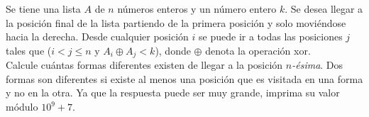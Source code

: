 %

Se tiene una lista $A$ de $n$ números enteros y un número entero $k$. Se desea llegar a la posición final de la lista partiendo de la primera posición y solo moviéndose hacia la derecha. Desde cualquier posición $i$ se puede ir a todas las posiciones $j$ tales que ($i < j \le n$ y $A_i \oplus A_j < k$), donde $\oplus$ denota la operación xor.\\

Calcule cuántas formas diferentes existen de llegar a la posición $n$\textit{-ésima}. Dos formas son diferentes si existe al menos una posición que es visitada en una forma y no en la otra. Ya que la respuesta puede ser muy grande, imprima su valor módulo $10^9+7$.\\





\sampleio
